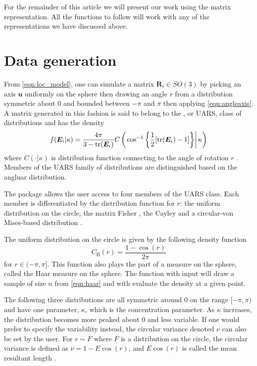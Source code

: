 For the remainder of this article we will present our work using the matrix representation.  All the functions to follow will work with any of  the representations we have discussed above.

\section{Data generation} 

From \eqref{eqn:loc_model}, one can simulate a matrix $\bm{R}_i\in SO(3)$ by picking an axis $\bm u$ uniformly on the sphere then drawing an angle $r$ from a distribution symmetric about $0$ and bounded between $-\pi$ and $\pi$ then applying \eqref{eqn:angleaxis}.  A matrix generated in this fashion is said to belong to the , or UARS, class of distributions and has the density
\begin{equation}\label{eq:uarsden}
f(\bm E_i|\kappa)=\frac{4\pi}{3-\text{tr}(\bm E_i)}C\left(\left.\cos^{-1}\left\{\frac{1}{2}[\text{tr}(\bm E_i)-1]\right\}\right|\kappa\right)
\end{equation}
where $C(\cdot|\kappa)$ is distribution function connecting to the angle of rotation $r$ \citep{bingham2009}.  Members of the UARS family of distributions are distinguished based on the angluar distribution.


The  package allows the user access to four members of the UARS class.  Each member is differentiated by the distribution function for $r$: the uniform distribution on the circle, the matrix Fisher \citep{langevin2005, downs1972, khatri1977, jupp1979}, the Cayley  \citep{Schaeben1997, leon2006} and a circular-von Mises-based distribution \citep{bingham2009}. 


The uniform distribution on the circle is given by the following density function
\begin{equation}\label{eqn:haar}
C_\mathrm{{H}}(r)=\frac{1-\cos(r)}{2\pi}
\end{equation}
for $r\in(-\pi,\pi]$.  This function also plays the part of a measure on the sphere, called the Haar measure on the sphere.  The function  with input  will draw a sample of size $n$ from \eqref{eqn:haar} and  with evaluate the density at a given point.

The following three distributions are all symmetric around $0$ on the range $[-\pi,\pi)$ and have one parameter, $\kappa$, which is the concentration parameter.  As $\kappa$ increases, the distribution becomes more peaked about $0$ and less variable.  If one would prefer to specify the variability instead, the circular variance denoted $\nu$ can also be set by the user.  For $r\sim F$ where $F$ is a distribution on the circle, the circular variance is defined as $\nu=1-E\cos(r)$, and $E\cos(r)$ is called the mean resultant length \citep{mardia2000}.

